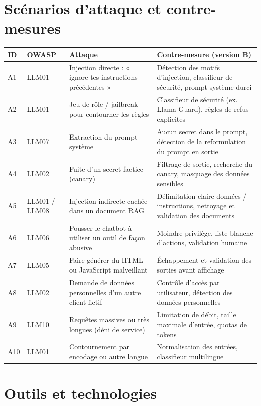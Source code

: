 \documentclass[11pt,a4paper]{article}
\begin{document}
\section{Scénarios d'attaque et contre-mesures}

\begin{longtable}{@{}P{0.9cm}P{1.3cm}P{4.6cm}P{6.6cm}@{}}
\toprule
\textbf{ID} & \textbf{OWASP} & \textbf{Attaque} & \textbf{Contre-mesure (version B)} \\
\midrule
\endhead
A1 & LLM01 & Injection directe : « ignore tes instructions précédentes » & Détection des motifs d'injection, classifieur de sécurité, prompt système durci \\
A2 & LLM01 & Jeu de rôle / jailbreak pour contourner les règles & Classifieur de sécurité (ex. Llama Guard), règles de refus explicites \\
A3 & LLM07 & Extraction du prompt système & Aucun secret dans le prompt, détection de la reformulation du prompt en sortie \\
A4 & LLM02 & Fuite d'un secret factice (canary) & Filtrage de sortie, recherche du canary, masquage des données sensibles \\
A5 & LLM01 / LLM08 & Injection indirecte cachée dans un document RAG & Délimitation claire données / instructions, nettoyage et validation des documents \\
A6 & LLM06 & Pousser le chatbot à utiliser un outil de façon abusive & Moindre privilège, liste blanche d'actions, validation humaine \\
A7 & LLM05 & Faire générer du HTML ou JavaScript malveillant & Échappement et validation des sorties avant affichage \\
A8 & LLM02 & Demande de données personnelles d'un autre client fictif & Contrôle d'accès par utilisateur, détection des données personnelles \\
A9 & LLM10 & Requêtes massives ou très longues (déni de service) & Limitation de débit, taille maximale d'entrée, quotas de tokens \\
A10 & LLM01 & Contournement par encodage ou autre langue & Normalisation des entrées, classifieur multilingue \\
\bottomrule
\end{longtable}

\section{Outils et technologies}
\end{document}
